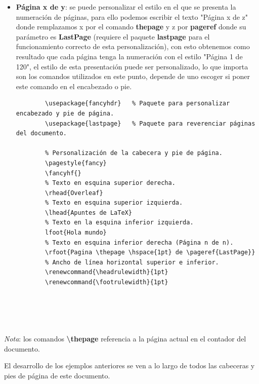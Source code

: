 \begin{itemize}
\begin{lstlisting}
        
    
        
    \end{lstlisting}
    \item \textbf{Página x de y}: se puede personalizar el estilo en el que se presenta la numeración de páginas, para ello podemos escribir el texto "Página x de z" donde remplazamos x por el comando \textbf{thepage} y z por \textbf{pageref} donde su parámetro es \textbf{LastPage} (requiere el paquete \textbf{lastpage} para el funcionamiento correcto de esta personalización), con esto obtenemos como resultado que cada página tenga la numeración con el estilo "Página 1 de 120", el estilo de esta presentación puede ser personalizado, lo que importa son los comandos utilizados en este punto, depende de uno escoger si poner este comando en el encabezado o pie.
    \begin{lstlisting}
        \usepackage{fancyhdr}	% Paquete para personalizar encabezado y pie de página.
        \usepackage{lastpage}	% Paquete para reverenciar páginas del documento.
    
        % Personalización de la cabecera y pie de página.
        \pagestyle{fancy}
        \fancyhf{}
        % Texto en esquina superior derecha.
        \rhead{Overleaf}
        % Texto en esquina superior izquierda.
        \lhead{Apuntes de LaTeX}
        % Texto en la esquina inferior izquierda.
        lfoot{Hola mundo}
        % Texto en esquina inferior derecha (Página n de n).
        \rfoot{Pagina \thepage \hspace{1pt} de \pageref{LastPage}}
        % Ancho de línea horizontal superior e inferior.
        \renewcommand{\headrulewidth}{1pt}
        \renewcommand{\footrulewidth}{1pt}

        
    
        
    \end{lstlisting}
\end{itemize}

\textit{Nota}: los comandos \textbf{\textbackslash{thepage}} referencia a la página actual en el contador del documento.

El desarrollo de los ejemplos anteriores se ven a lo largo de todos las cabeceras y pies de página de este documento.
